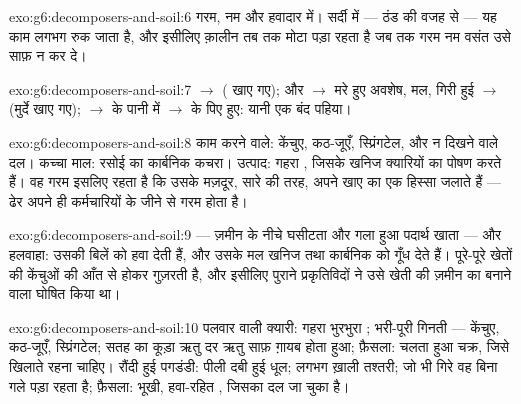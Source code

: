 \begin{solution}{exo:g6:decomposers-and-soil:6}
गरम, नम और हवादार में। सर्दी में --- ठंड की वजह से --- यह काम लगभग रुक
जाता है, और इसीलिए क़ालीन तब तक मोटा पड़ा रहता है जब तक गरम नम वसंत उसे
साफ़ न कर दे।
\end{solution}

\begin{solution}{exo:g6:decomposers-and-soil:7}
 $\rightarrow$  ( खाए गए);  और
 $\rightarrow$ मरे हुए अवशेष, मल, गिरी हुई
 $\rightarrow$  (मुर्दे खाए गए);
 $\rightarrow$  के पानी में 
$\rightarrow$  के पिए हुए: यानी एक बंद पहिया।
\end{solution}

\begin{solution}{exo:g6:decomposers-and-soil:8}
काम करने वाले: केंचुए, कठ-जूएँ, स्प्रिंगटेल,  और न दिखने वाले दल।
कच्चा माल: रसोई का कार्बनिक कचरा। उत्पाद: गहरा , जिसके खनिज
क्यारियों का पोषण करते हैं। वह गरम इसलिए रहता है कि उसके मज़दूर, सारे
 की तरह, अपने खाए का एक हिस्सा जलाते हैं --- ढेर अपने ही
कर्मचारियों के जीने से गरम होता है।
\end{solution}

\begin{solution}{exo:g6:decomposers-and-soil:9}
 ---  ज़मीन के नीचे घसीटता और गला हुआ पदार्थ खाता --- और
हलवाहा: उसकी बिलें  को हवा देती हैं, और उसके मल खनिज तथा कार्बनिक
को गूँध देते हैं। पूरे-पूरे खेतों की  केंचुओं की आँत से होकर
गुज़रती है, और इसीलिए पुराने प्रकृतिविदों ने उसे खेती की ज़मीन का बनाने
वाला घोषित किया था।
\end{solution}

\begin{solution}{exo:g6:decomposers-and-soil:10}
पलवार वाली क्यारी: गहरा भुरभुरा ; भरी-पूरी गिनती --- केंचुए,
कठ-जूएँ, स्प्रिंगटेल; सतह का कूड़ा ऋतु दर ऋतु साफ़ ग़ायब होता हुआ;
फ़ैसला: चलता हुआ चक्र, जिसे खिलाते रहना चाहिए। रौंदी हुई पगडंडी: पीली
दबी हुई धूल; लगभग ख़ाली तश्तरी; जो भी गिरे वह बिना गले पड़ा रहता है;
फ़ैसला: भूखी, हवा-रहित , जिसका दल जा चुका है।
\end{solution}

